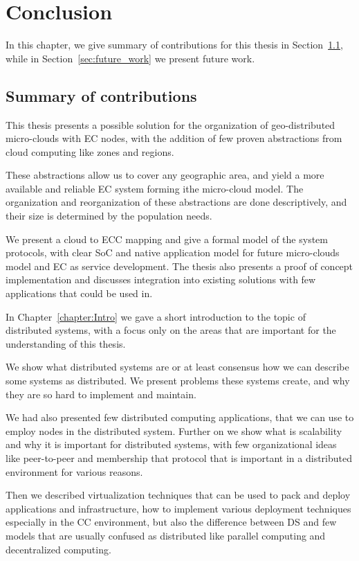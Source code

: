 \chapter{Conclusion}\label{chapter:Conclusion}
%
In this chapter, we give summary of contributions for this thesis in Section~\ref{sec:summary_of_contributions}, while in Section~\ref{sec:future_work} we present future work.
%
%
\section{Summary of contributions}\label{sec:summary_of_contributions}
%
This thesis presents a possible solution for the organization of geo-distributed micro-clouds with EC nodes, with the addition of few proven abstractions from cloud computing like zones and regions. 

These abstractions allow us to cover any geographic area, and yield a more available and reliable EC system forming ithe micro-cloud model. The organization and reorganization of these abstractions are done descriptively, and their size is determined by the population needs. 

We present a cloud to ECC mapping and give a formal model of the system protocols, with clear SoC and native application model for future micro-clouds model and EC as service development. The thesis also presents a proof of concept implementation and discusses integration into existing solutions with few applications that could be used in.

In Chapter~\ref{chapter:Intro} we gave a short introduction to the topic of distributed systems, with a focus only on the areas that are important for the understanding of this thesis. 

We show what distributed systems are or at least consensus how we can describe some systems as distributed. We present problems these systems create, and why they are so hard to implement and maintain. 

We had also presented few distributed computing applications, that we can use to employ nodes in the distributed system. Further on we show what is scalability and why it is important for distributed systems, with few organizational ideas like peer-to-peer and membership that protocol that is important in a distributed environment for various reasons.

Then we described virtualization techniques that can be used to pack and deploy applications and infrastructure, how to implement various deployment techniques especially in the CC environment, but also the difference between DS and few models that are usually confused as distributed like parallel computing and decentralized computing.

